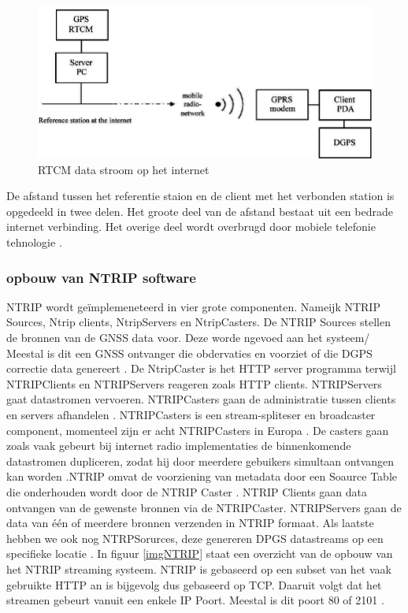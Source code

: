 \begin{figure}[hpb]
	\includegraphics[scale=0.4]{NTRIP2.png}
	\caption{RTCM data stroom op het internet \cite{LBibNTRIP2}}
	\label{imgNTRIP2}
\end{figure} 
De afstand tussen het referentie staion en de client met het verbonden station is opgedeeld in twee delen. Het groote deel van de afstand bestaat uit een bedrade internet verbinding. Het overige deel wordt overbrugd door mobiele telefonie tehnologie \cite{LBibNTRIP2}.

\subsubsection{opbouw van NTRIP software}
\label{LONS}
NTRIP wordt ge\"implemeneteerd in vier grote componenten. Nameijk NTRIP Sources, Ntrip clients, NtripServers en NtripCasters. De NTRIP Sources stellen de bronnen van de GNSS data voor. Deze worde ngevoed aan het systeem/ Meestal is dit een GNSS ontvanger die obdervaties en voorziet of die DGPS correctie data genereert \cite{LBibNTRIP3}. De NtripCaster is het HTTP server programma terwijl NTRIPClients en NTRIPServers reageren zoals HTTP clients\cite{LBibNTRIP}. NTRIPServers gaat datastromen vervoeren. NTRIPCasters gaan de administratie tussen clients en servers afhandelen \cite{LBibGPS}. NTRIPCasters is een stream-spliteser en broadcaster component, momenteel zijn er acht NTRIPCasters in Europa \cite{LBibNTRIP}. De casters gaan zoals vaak gebeurt bij internet radio implementaties de binnenkomende datastromen dupliceren, zodat hij door meerdere gebuikers simultaan ontvangen kan worden \cite{LBibNTRIP2}.NTRIP omvat de voorziening van metadata door een Soaurce Table die onderhouden wordt door de NTRIP Caster \cite{LBibNTRIP3}.  NTRIP Clients gaan data ontvangen van de gewenste bronnen via de NTRIPCaster. NTRIPServers gaan de data van \'e\'en of meerdere bronnen verzenden in NTRIP formaat. Als laatste hebben we ook nog NTRPSorurces, deze genereren DPGS datastreams op een specifieke locatie \cite{LBibNTRIP}. In figuur \ref{imgNTRIP} staat een overzicht van de opbouw van het NTRIP streaming systeem. NTRIP is gebaseerd op een subset van het  vaak gebruikte HTTP an is bijgevolg dus gebaseerd op TCP. Daaruit volgt dat het streamen gebeurt vanuit een enkele IP Poort. Meestal is dit poort 80 of 2101 \cite{LBibNTRIP3}. 

